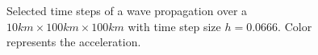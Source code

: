 
\begin{figure}
\caption{Selected time steps of a wave propagation over a $10km \times 100km \times 100km$ 
with time step size $h=0.0666$. Color represents the acceleration.}
\label{WAVE FIG 2}
\end{figure}


